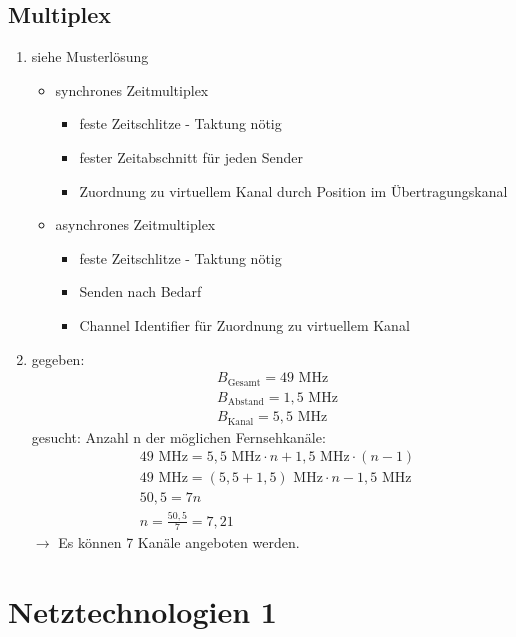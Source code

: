 \subsection{Multiplex}
\begin{enumerate}
	\item siehe Musterlösung
	\begin{itemize}
		\item synchrones Zeitmultiplex
		\begin{itemize}
			\item feste Zeitschlitze - Taktung nötig
			\item fester Zeitabschnitt für jeden Sender
			\item Zuordnung zu virtuellem Kanal durch Position im Übertragungskanal
		\end{itemize}
		\item asynchrones Zeitmultiplex
		\begin{itemize}
			\item feste Zeitschlitze - Taktung nötig
			\item Senden nach Bedarf
			\item Channel Identifier für Zuordnung zu virtuellem Kanal
		\end{itemize}
	\end{itemize}
	\item gegeben:
	\begin{align*}
		&B_{\text{Gesamt}} = 49 \text{ MHz} \\
		&B_{\text{Abstand}} = 1,5 \text{ MHz} \\
		&B_{\text{Kanal}} = 5,5 \text{ MHz}
	\end{align*}
	gesucht: Anzahl n der möglichen Fernsehkanäle:
	\begin{align*}
		&49 \text{ MHz} = 5,5 \text{ MHz} \cdot n + 1,5 \text{ MHz} \cdot (n - 1) \\
		&49\text{ MHz} = (5,5+1,5)\text{ MHz} \cdot n - 1,5 \text{ MHz} \\
		&50,5 = 7n \\
		&n = \frac{50,5}{7} = 7,21
	\end{align*}
	\(\to\) Es können 7 Kanäle angeboten werden.
\end{enumerate} 

\section{Netztechnologien 1}
